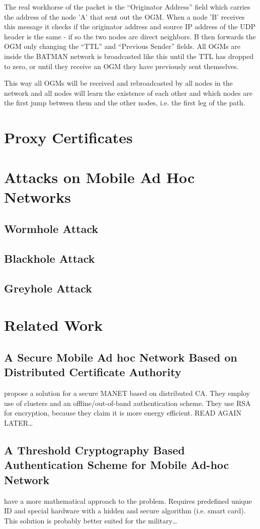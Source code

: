 The real workhorse of the packet is the ``Originator Address'' field which
carries the address of the node 'A' that sent out the \ac{OGM}. When a node 'B'
receives this message it checks if the originator address and source IP address
of the UDP header is the same - if so the two nodes are direct neighbors. B then
forwards the \ac{OGM} only changing the ``TTL'' and ``Previous Sender'' fields.
All \acp{OGM} are inside the BATMAN network is broadcasted like this until the
TTL has dropped to zero, or until they receive an \ac{OGM} they have
previously sent themselves.

This way all \acp{OGM} will be received and rebroadcasted by all nodes in the
network and all nodes will learn the existence of each other and which nodes are
the first jump between them and the other nodes, i.e. the first leg of the path.



\section{Proxy Certificates}

\section{Attacks on Mobile Ad Hoc Networks}
\subsection{Wormhole Attack}
\subsection{Blackhole Attack}
\subsection{Greyhole Attack}

\section{Related Work}

\subsection{A Secure Mobile Ad hoc Network Based on Distributed Certificate
Authority}
\cite{hosseinisecure} propose a solution for a secure MANET based on distributed
CA. They employ use of clusters and an offline/out-of-band authentication
scheme. They use RSA for encryption, because they claim it is more energy
efficient. READ AGAIN LATER\ldots

\subsection{A Threshold Cryptography Based Authentication Scheme for Mobile
Ad-hoc Network}
\cite{springerlink:Haimabati} have a more mathematical approach
to the problem. Requires predefined unique ID and special hardware with a hidden
and secure algorithm (i.e. smart card). This solution is probably better suited
for the military\ldots
